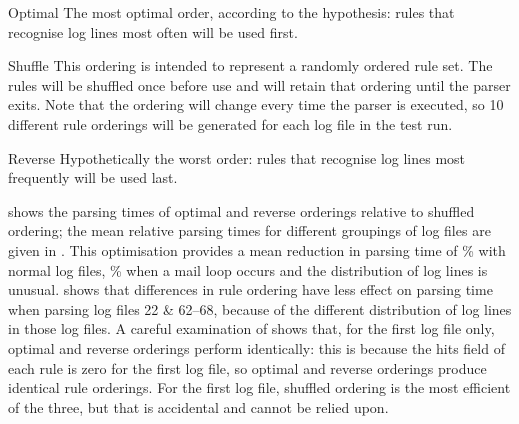 \begin{boldeqlist}

    \item [Optimal]  The most optimal order, according to the hypothesis:
        rules that recognise log lines most often will be used first.

    \item [Shuffle] This ordering is intended to represent a randomly
        ordered rule set.  The rules will be shuffled once before use and
        will retain that ordering until the parser exits.  Note that the
        ordering will change every time the parser is executed, so 10
        different rule orderings will be generated for each log file in the
        test run.

    \item [Reverse] Hypothetically the worst order: rules that recognise
        log lines most frequently will be used last.

\end{boldeqlist}

 shows the parsing times of optimal and reverse
orderings relative to shuffled ordering; the mean relative parsing times
for different groupings of log files are given in .  This
optimisation provides a mean reduction in parsing time of
\%
with normal log files,
\%
when a mail loop occurs and the distribution of log lines is unusual.
 shows that differences in rule ordering have less
effect on parsing time when parsing log files 22 \& 62--68, because of the
different distribution of log lines in those log files.  A careful
examination of  shows that, for the first log file
only, optimal and reverse orderings perform identically: this is because
the hits field of each rule is zero for the first log file, so optimal and
reverse orderings produce identical rule orderings.  For the first log
file, shuffled ordering is the most efficient of the three, but that is
accidental and cannot be relied upon.


